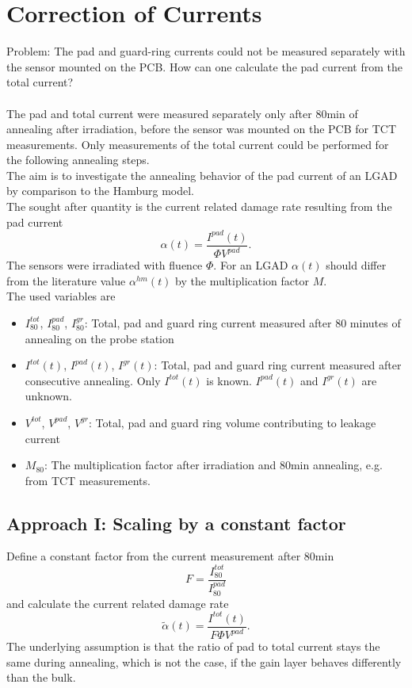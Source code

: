 \documentclass{article}
\begin{document}
\section{Correction of Currents}
Problem: The pad and guard-ring currents could not be measured separately with the sensor mounted on the PCB. How can one calculate the pad current from the total current?
\\ \\
The pad and total current were measured separately only after 80min of annealing after irradiation, before the sensor was mounted on the PCB for TCT measurements. Only measurements of the total current could be performed for the following annealing steps.\\
The aim is to investigate the annealing behavior of the pad current of an LGAD by comparison to the Hamburg model.\\
The sought after quantity is the current related damage rate resulting from the pad current
\begin{equation}
\alpha(t)=\frac{I^{pad}(t)}{\Phi V^{pad}}.
\end{equation}
The sensors were irradiated with fluence $\Phi$. For an LGAD $\alpha(t)$ should differ from the literature value $\alpha^{hm}(t)$ by the multiplication factor $M$.\\
The used variables are
\begin{itemize}
\item $I^{tot}_{80}$, $I^{pad}_{80}$, $I^{gr}_{80}$: Total, pad and guard ring current measured after 80 minutes of annealing on the probe station
\item $I^{tot}(t)$, $I^{pad}(t)$, $I^{gr}(t)$: Total, pad and guard ring current measured after consecutive annealing. Only $I^{tot}(t)$ is known. $I^{pad}(t)$ and $I^{gr}(t)$ are unknown.
\item $V^{tot}$, $V^{pad}$, $V^{gr}$: Total, pad and guard ring volume contributing to leakage current
\item $M_{80}$: The multiplication factor after irradiation and 80min annealing, e.g. from TCT measurements.
\end{itemize}
\subsection{Approach I: Scaling by a constant factor}
Define a constant factor from the current measurement after 80min
\begin{equation}\label{eq:F}
F=\frac{I^{tot}_{80}}{I^{pad}_{80}}
\end{equation}
and calculate the current related damage rate
\begin{equation}\label{eq:alphatilde}
\tilde{\alpha}(t)=\frac{I^{tot}(t)}{F \Phi V^{pad}}.
\end{equation}
The underlying assumption is that the ratio of pad to total current stays the same during annealing, which is not the case, if the gain layer behaves differently than the bulk.
\end{document}

